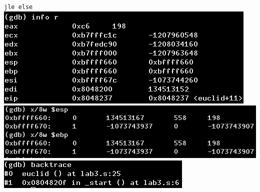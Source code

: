 \documentclass{article}
\begin{document}
\begin{minipage}{8cm}
\verb|jle else|\\
\includegraphics[scale=0.4]{info9.png} \\
\includegraphics[scale=0.4]{x9.png} \\
\includegraphics[scale=0.5]{bt9.png} \\
\end{minipage}
\clearpage
\end{document}

